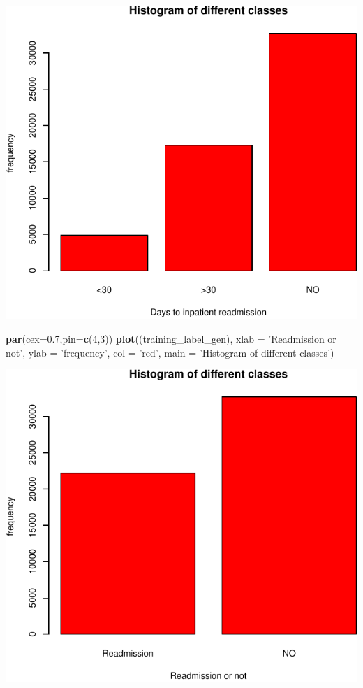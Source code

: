 \documentclass[]{article}
\newenvironment{Shaded}{\begin{snugshade}}{\end{snugshade}}
\newcommand{\KeywordTok}[1]{\textcolor[rgb]{0.13,0.29,0.53}{\textbf{{#1}}}}
\newcommand{\DataTypeTok}[1]{\textcolor[rgb]{0.13,0.29,0.53}{{#1}}}
\newcommand{\DecValTok}[1]{\textcolor[rgb]{0.00,0.00,0.81}{{#1}}}
\newcommand{\FloatTok}[1]{\textcolor[rgb]{0.00,0.00,0.81}{{#1}}}
\newcommand{\StringTok}[1]{\textcolor[rgb]{0.31,0.60,0.02}{{#1}}}
\newcommand{\NormalTok}[1]{{#1}}
\begin{document}
\includegraphics{Project_files/figure-latex/Preprocessing_classtype-1.pdf}

\begin{Shaded}
\begin{Highlighting}[]
\KeywordTok{par}\NormalTok{(}\DataTypeTok{cex=}\FloatTok{0.7}\NormalTok{,}\DataTypeTok{pin=}\KeywordTok{c}\NormalTok{(}\DecValTok{4}\NormalTok{,}\DecValTok{3}\NormalTok{))}
\KeywordTok{plot}\NormalTok{((training_label_gen), }\DataTypeTok{xlab =} \StringTok{'Readmission or not'}\NormalTok{, }\DataTypeTok{ylab =} \StringTok{'frequency'}\NormalTok{,}
     \DataTypeTok{col =} \StringTok{'red'}\NormalTok{, }\DataTypeTok{main =} \StringTok{'Histogram of different classes'}\NormalTok{)}
\end{Highlighting}
\end{Shaded}

\includegraphics{Project_files/figure-latex/Preprocessing_classtype-2.pdf}
\end{document}

